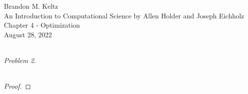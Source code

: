 \documentclass{article}
\begin{document}
	\begin{flushleft}

		Brandon M. Keltz\\
		An Introduction to Computational Science by Allen Holder and Joseph Eichholz\\
		Chapter 4 - Optimization\\
		August 28, 2022\\\

		\textit{Problem 2}.  \\\

		\begin{proof}

			

		\end{proof}

	\end{flushleft}
\end{document}
